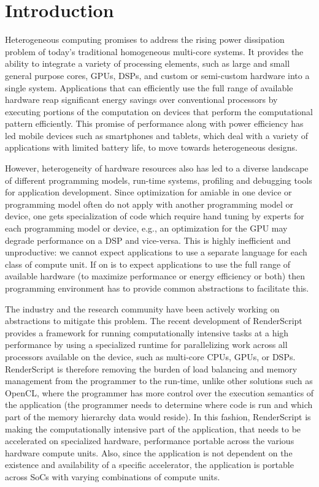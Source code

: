 \section{Introduction}

Heterogeneous computing promises to address the rising power dissipation problem
of today's traditional homogeneous multi-core
systems. It provides the ability to integrate a variety of processing elements,
such as large and small general purpose cores, GPUs, DSPs, and custom or
semi-custom hardware into a single system. Applications that can efficiently use
the full range of available hardware reap significant energy
savings over conventional processors by executing portions of the computation on
devices that perform the computational pattern efficiently.
This promise of performance along with power efficiency
has led mobile devices such as smartphones
and tablets, which deal with a variety of applications with limited battery
life, to move towards heterogeneous designs.

However, heterogeneity of hardware resources also has led to a diverse landscape
of different programming models, run-time systems, profiling and debugging tools
for application development. Since optimization for amiable in one device or
programming model often do not apply with another programming model or device, 
one gets specialization of code which require hand tuning by experts for each 
programming model or device, e.g., an optimization for the GPU may degrade performance
on a DSP and vice-versa. This is highly inefficient and
unproductive: we cannot expect applications to use a separate language for each
class of compute unit. If on is to expect applications to use the full range of
available hardware (to maximize performance or energy efficiency or both) then
programming environment has to provide common abstractions to facilitate this.

The industry and the research community have been actively working on abstractions
    to mitigate this problem.
The recent development of RenderScript~\cite{wiki:RenderScript, RenderScript}
provides a framework for running computationally intensive tasks at a high
performance by using a specialized runtime for parallelizing work across all
processors available on the device, such as multi-core CPUs, GPUs, or DSPs.
RenderScript is therefore removing the burden of load balancing and memory
management from the programmer to the run-time, unlike other solutions such as
OpenCL, where the programmer has more control over the execution semantics of
the application (the programmer needs to determine where code is run and
 which part of the memory hierarchy data would reside).  In this fashion,
RenderScript is making the computationally intensive part of the application,
that needs to be accelerated on specialized hardware, performance portable
across the various hardware compute units. Also, since the application is not
dependent on the existence and availability of a specific accelerator, the
application is portable across SoCs with varying combinations of compute units.

